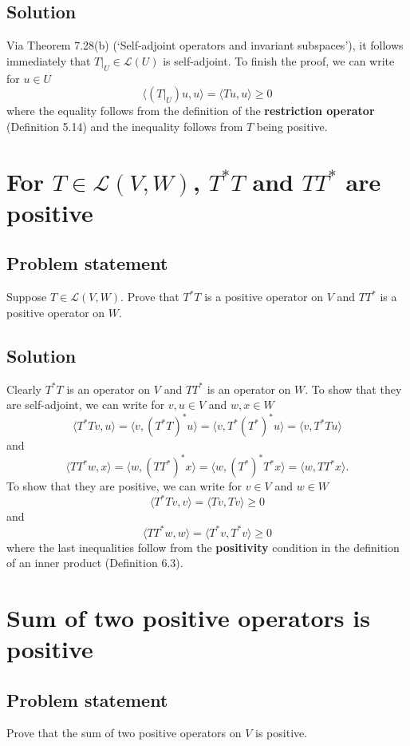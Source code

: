 \documentclass{article}
\begin{document}
\subsection*{Solution}
Via Theorem 7.28(b) (`Self-adjoint operators and invariant subspaces'), it follows immediately that $T|_U\in\mathcal{L}(U)$ is self-adjoint. To finish the proof, we can write for $u\in U$
\[\langle (T|_U)u,u\rangle=\langle Tu,u\rangle\geq 0\]
where the equality follows from the definition of the \textbf{restriction operator} (Definition 5.14) and the inequality follows from $T$ being positive.

\clearpage

\section{For $T\in\mathcal{L}(V,W)$, $T^*T$ and $TT^*$ are positive}
\subsection*{Problem statement}
Suppose $T\in\mathcal{L}(V,W)$. Prove that $T^*T$ is a positive operator on $V$ and $TT^*$ is a positive operator on $W$.

\subsection*{Solution}
Clearly $T^*T$ is an operator on $V$ and $TT^*$ is an operator on $W$. To show that they are self-adjoint, we can write for $v,u\in V$ and $w,x\in W$
\[\langle T^*Tv,u\rangle=\langle v,(T^*T)^*u\rangle=\langle v,T^*(T^*)^*u\rangle=\langle v,T^*Tu\rangle\]
and
\[\langle TT^*w,x\rangle=\langle w,(TT^*)^*x\rangle=\langle w,(T^*)^*T^*x\rangle=\langle w,TT^*x\rangle.\]
To show that they are positive, we can write for $v\in V$ and $w\in W$
\[\langle T^*Tv,v\rangle=\langle Tv,Tv\rangle\geq 0\]
and
\[\langle TT^*w,w\rangle=\langle T^*v,T^*v\rangle\geq 0\]
where the last inequalities follow from the \textbf{positivity} condition in the definition of an inner product (Definition 6.3).

\clearpage

\section{Sum of two positive operators is positive}
\subsection*{Problem statement}
Prove that the sum of two positive operators on $V$ is positive.
\end{document}
